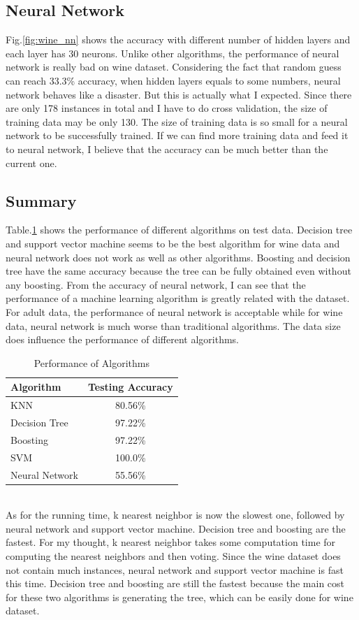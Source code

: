\documentclass[11pt]{article}
\begin{document}
\subsection{Neural Network}
Fig.\ref{fig:wine_nn} shows the accuracy with different number of hidden layers and each layer has 30 neurons. Unlike other algorithms, the performance of neural network is really bad on wine dataset. Considering the fact that random guess can reach 33.3\% accuracy, when hidden layers equals to some numbers, neural network behaves like a disaster. But this is actually what I expected. Since there are only 178 instances in total and I have to do cross validation, the size of training data may be only 130. The size of training data is so small for a neural network to be successfully trained. If we can find more training data and feed it to neural network, I believe that the accuracy can be much better than the current one. 
\subsection{Summary}
Table.\ref{tab:wine} shows the performance of different algorithms on test data. Decision tree and support vector machine seems to be the best algorithm for wine data and neural network does not work as well as other algorithms. Boosting and decision tree have the same accuracy because the tree can be fully obtained even without any boosting. From the accuracy of neural network, I can see that the performance of a machine learning algorithm is greatly related with the dataset. For adult data, the performance of neural network is acceptable while for wine data, neural network is much worse than traditional algorithms. The data size does influence the performance of different algorithms.\\
\begin{table}[h!]
  \begin{center}
    \caption{Performance of Algorithms}
    \label{tab:wine}
    \begin{tabular}{l|c}
      \textbf{Algorithm} & \textbf{Testing Accuracy}\\
      \hline
      KNN & 80.56\%\\
      Decision Tree & 97.22\%\\
      Boosting & 97.22\%\\
      SVM & 100.0\% \\
      Neural Network & 55.56\%\\
    \end{tabular}
  \end{center}
\end{table}\\
As for the running time, k nearest neighbor is now the slowest one, followed by neural network and support vector machine. Decision tree and boosting are the fastest. For my thought, k nearest neighbor takes some computation time for computing the nearest neighbors and then voting. Since the wine dataset does not contain much instances, neural network and support vector machine is fast this time. Decision tree and boosting are still the fastest because the main cost for these two algorithms is generating the tree, which can be easily done for wine dataset.
\end{document}
